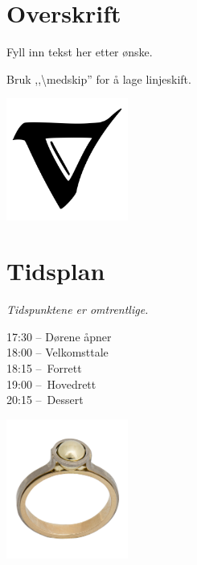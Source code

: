 \documentclass{article}
\begin{document}
\pagestyle{empty}

\begin{landscape}
\begin{multicols}{3}

\begin{center}

\normalsize


\section*{Overskrift}
Fyll inn tekst her etter ønske.

\medskip
Bruk ,,\textbackslash{}medskip'' for å lage linjeskift.

\begin{center}
\includegraphics[width=0.3\textwidth]{bilder/nabla.jpg}
\end{center}

\columnbreak
\section*{Tidsplan}
\emph{Tidspunktene er omtrentlige.}

17:30 – Dørene åpner \\
18:00 – Velkomsttale \\
18:15 – Forrett \\
19:00 – Hovedrett \\
20:15 – Dessert \\

\begin{center}
\includegraphics[width=0.3\textwidth]{bilder/siving.png}
\end{center}


\end{center}
\end{multicols}
\end{landscape}
\end{document}
